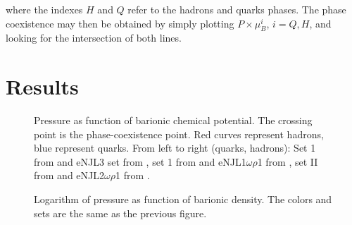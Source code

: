 \documentclass[plainsections,alongposter]{sciposterlocal}
\begin{document}
\begin{multicols}{2}
\noindent{}where the indexes $H$ and $Q$ refer to the hadrons and quarks phases. The phase coexistence may then be obtained by simply plotting $P \times \mu_B^i$, $i = Q, H$, and looking for the intersection of both lines.

\section*{Results}

\begin{figure}

\caption{Pressure as function of barionic chemical potential. The crossing point is the phase-coexistence point. Red curves represent hadrons, blue represent quarks. From left to right (quarks, hadrons): Set 1 from \cite{Buballa1996} and eNJL3 set from \cite{Pais2016}, set 1 from \cite{Buballa1996} and eNJL1$\omega\rho$1 from \cite{Pais2016}, set II from \cite{Buballa2005} and eNJL2$\omega\rho$1 from \cite{Pais2016}.}
\end{figure}
%
\begin{figure}

\caption{Logarithm of pressure as function of barionic density. The colors and sets are the same as the previous figure.}
\end{figure}

%

{ \footnotesize

}

\end{multicols}
\end{document}
